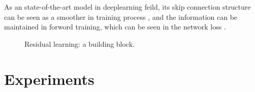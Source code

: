 \documentclass[conference]{IEEEtran}
\begin{document}
As an state-of-the-art model in deeplearning feild, its skip connection structure can be seen as a smoother in training process \cite{Veit2016Residual}, and the information can be maintained in forword training, which can be seen in the network loss \cite{touretzky1996advances}.

\begin{center}
	\begin{figure}
		\centering
		\caption{Residual learning: a building block.\cite{He2016Deep}}
		\label{kFig0}
	\end{figure}
\end{center}

\section{Experiments}
\end{document}
